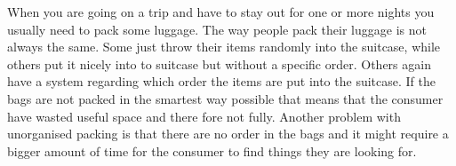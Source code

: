 When you are going on a trip and have to stay out for one or more nights you usually need to pack some luggage. The way people pack their luggage is not always the same. Some just throw their items randomly into the suitcase, while others put it nicely into to suitcase but without a specific order.
Others again have a system regarding which order the items are put into the suitcase. If the bags are not packed in the smartest way possible that means that the consumer have wasted useful space and there fore not fully.
Another problem with unorganised packing is that there are no order in the bags and it might require a bigger amount of time for the consumer to find things they are looking for.